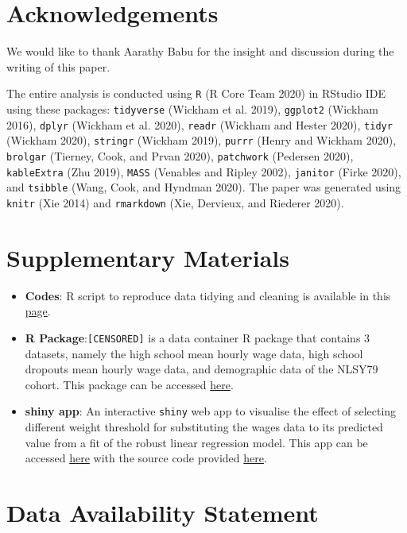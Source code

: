 \documentclass{article}
\begin{document}
\hypertarget{acknowledgements}{%
\section{Acknowledgements}\label{acknowledgements}}

We would like to thank Aarathy Babu for the insight and discussion during the writing of this paper.

The entire analysis is conducted using \texttt{R} (R Core Team 2020) in RStudio IDE using these packages: \texttt{tidyverse} (Wickham et al. 2019), \texttt{ggplot2} (Wickham 2016), \texttt{dplyr} (Wickham et al. 2020), \texttt{readr} (Wickham and Hester 2020), \texttt{tidyr} (Wickham 2020), \texttt{stringr} (Wickham 2019), \texttt{purrr} (Henry and Wickham 2020), \texttt{brolgar} (Tierney, Cook, and Prvan 2020), \texttt{patchwork} (Pedersen 2020), \texttt{kableExtra} (Zhu 2019), \texttt{MASS} (Venables and Ripley 2002), \texttt{janitor} (Firke 2020), and \texttt{tsibble} (Wang, Cook, and Hyndman 2020). The paper was generated using \texttt{knitr} (Xie 2014) and \texttt{rmarkdown} (Xie, Dervieux, and Riederer 2020).

\hypertarget{supplementary-materials}{%
\section{Supplementary Materials}\label{supplementary-materials}}

\begin{itemize}
\item
  \textbf{Codes}: R script to reproduce data tidying and cleaning is available in this \href{CENSORED/articles/process-data.html}{page}.
\item
  \textbf{R Package}:\texttt{[CENSORED]} is a data container R package that contains 3 datasets, namely the high school mean hourly wage data, high school dropouts mean hourly wage data, and demographic data of the NLSY79 cohort. This package can be accessed \href{CENSORED}{here}.
\item
  \textbf{shiny app}: An interactive \texttt{shiny} web app to visualise the effect of selecting different weight threshold for substituting the wages data to its predicted value from a fit of the robust linear regression model. This app can be accessed \href{CENSORED}{here} with the source code provided \href{CENSORED/tree/master/app}{here}.
\end{itemize}

\hypertarget{data-availability-statement}{%
\section{Data Availability Statement}\label{data-availability-statement}}
\end{document}
